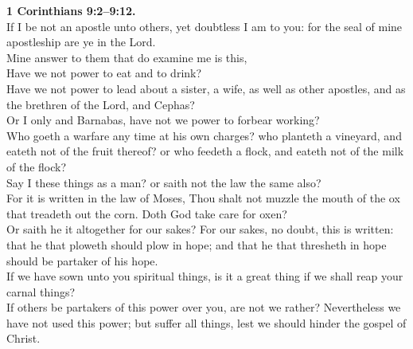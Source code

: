 \documentclass[10pt]{article} %
\begin{document}
{\begin{minipage}[t]{0.45\textwidth}
\textbf{1 Corinthians 9:2--9:12.}\\
If I be not an apostle unto others, yet doubtless I am to you: for the seal of mine apostleship are ye in the Lord.\\
Mine answer to them that do examine me is this,\\
Have we not power to eat and to drink?\\
Have we not power to lead about a sister, a wife, as well as other apostles, and as the brethren of the Lord, and Cephas?\\
Or I only and Barnabas, have not we power to forbear working?\\
Who goeth a warfare any time at his own charges? who planteth a vineyard, and eateth not of the fruit thereof? or who feedeth a flock, and eateth not of the milk of the flock?\\
Say I these things as a man? or saith not the law the same also?\\
For it is written in the law of Moses, Thou shalt not muzzle the mouth of the ox that treadeth out the corn. Doth God take care for oxen?\\
Or saith he it altogether for our sakes? For our sakes, no doubt, this is written: that he that ploweth should plow in hope; and that he that thresheth in hope should be partaker of his hope.\\
If we have sown unto you spiritual things, is it a great thing if we shall reap your carnal things?\\
If others be partakers of this power over you, are not we rather? Nevertheless we have not used this power; but suffer all things, lest we should hinder the gospel of Christ.
\end{minipage}}
\vspace*{\fill}
\newpage
\Huge%
\vspace*{\fill}
\end{document}
